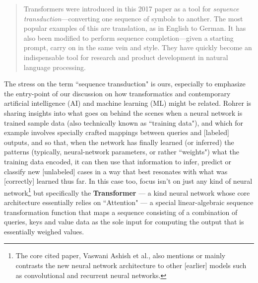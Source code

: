 \documentclass[a4paper, 18pt]{book} %
\begin{document}
\begin{appendices}
\noindent
\begin{minipage}{1\textwidth}
\vspace{1em}
\begin{quotation}
{\ttfamily

Transformers were introduced in this 2017 paper\cite{Vaswani2017} as a tool for \textit{sequence transduction}---converting one sequence of symbols to another. The most popular examples of this are translation, as in English to German. It has also been modified to perform sequence completion---given a starting prompt, carry on in the same vein and style. They have quickly become an indispensable tool for research and product development in natural language processing.

}
\end{quotation}
\vspace{1em}
\end{minipage}

\vspace{2em}


The stress on the term ``sequence transduction" is ours, especially to emphasize the entry-point of our discussion on how transformatics and contemporary artificial intelligence (AI) and machine learning (ML) might be related. Rohrer is sharing insights into what goes on behind the scenes when a neural network is trained sample data (also technically known as ``training data"), and which for example involves specially crafted mappings between queries and [labeled] outputs, and so that, when the network has finally learned (or inferred) the patterns (typically, neural-network parameters, or rather ``weights") what the training data encoded, it can then use that information to infer, predict or classify new [unlabeled] cases in a way that best resonates with what was [correctly] learned thus far. In this case too, focus isn't on just any kind of neural network\footnote{The core cited paper, Vaswani Ashish et al.\cite{Vaswani2017}, also mentions or mainly contrasts the new neural network architecture to other [earlier] models such as convolutional and recurrent neural networks.} but specifically the \textbf{Transformer}\cite{Vaswani2017} --- a kind neural network whose core architecture essentially relies on ``Attention" --- a special linear-algebraic sequence transformation function that maps a sequence consisting of a combination of queries, keys and value data as the sole input for computing the output that is essentially weighed values\cite{Vaswani2017}.

\vspace{2em}


\end{appendices}
\end{document}
